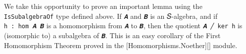 We take this opportunity to prove an important lemma using the
\texttt{IsSubalgebraOf} type defined above. If \texttt{𝑨} and \texttt{𝑩}
is an 𝑆-algebra, and if \texttt{h\ :\ hom\ 𝑨\ 𝑩} is a homomorphism from
\texttt{𝑨} to \texttt{𝑩}, then the quotient \texttt{𝑨\ ╱\ ker\ h} is
(isomorphic to) a subalgebra of \texttt{𝑩}. This is an easy corollary of
the First Homomorphism Theorem proved in the
{[}Homomorphisms.Noether{]}{[}{]} module.
\ccpad
\begin{code}%
\>[0]\AgdaSpace{}%
\<%
\\
%
\\[\AgdaEmptyExtraSkip]%
\>[0]\AgdaSpace{}%
\AgdaSymbol{:}%
\>[103I]\AgdaSymbol{\{}\AgdaSpace{}%
\AgdaSpace{}%
\AgdaSymbol{:}\AgdaSpace{}%
\AgdaSymbol{\}(}\AgdaSpace{}%
\AgdaSymbol{:}\AgdaSpace{}%
\AgdaSpace{}%
\AgdaSpace{}%
\AgdaSymbol{)(}\AgdaSpace{}%
\AgdaSymbol{:}\AgdaSpace{}%
\AgdaSpace{}%
\AgdaSpace{}%
\AgdaSymbol{)(}\AgdaSpace{}%
\AgdaSymbol{:}\AgdaSpace{}%
\AgdaSpace{}%
\AgdaSpace{}%
\AgdaSymbol{)}\<%
\\
\>[.][@{}l@{}]\<[103I]%
\>[20]\<%
\\
\>[0][@{}l@{\AgdaIndent{0}}]%
\>[1]%
\>[23]\AgdaSpace{}%
\AgdaSpace{}%
\AgdaSpace{}%
\AgdaSpace{}%
\AgdaSpace{}%
\AgdaSpace{}%
\AgdaSpace{}%
\AgdaSpace{}%
\AgdaSpace{}%
\<%
\\
%
\>[1]%
\>[23]\AgdaSpace{}%
\AgdaSpace{}%
\AgdaSpace{}%
\AgdaSpace{}%
\AgdaSpace{}%
\AgdaSymbol{(}\AgdaSpace{}%
\AgdaSpace{}%
\AgdaSpace{}%
\AgdaSpace{}%
\AgdaSpace{}%
\AgdaSpace{}%
\AgdaSymbol{))}\<%
\\
%
\>[1]%
\>[23]\AgdaSpace{}%
\AgdaSpace{}%
\AgdaSpace{}%
\AgdaSpace{}%
\AgdaSymbol{(}\AgdaSymbol{\{}\AgdaSpace{}%

\end{code}
